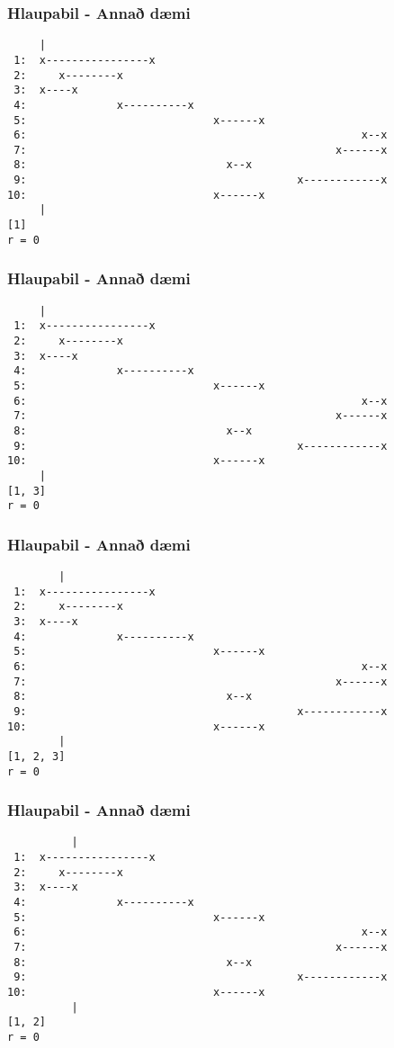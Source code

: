 \documentclass{beamer}
\begin{document}
\begin{frame}[fragile]
	\frametitle{Hlaupabil - Annað dæmi}
\begin{verbatim}
     |
 1:  x----------------x
 2:     x--------x
 3:  x----x
 4:              x----------x
 5:                             x------x
 6:                                                    x--x
 7:                                                x------x
 8:                               x--x
 9:                                          x------------x
10:                             x------x
     |
[1]
r = 0
\end{verbatim}
\end{frame}
\addtocounter{framenumber}{-1}

\begin{frame}[fragile]
	\frametitle{Hlaupabil - Annað dæmi}
\begin{verbatim}
     |
 1:  x----------------x
 2:     x--------x
 3:  x----x
 4:              x----------x
 5:                             x------x
 6:                                                    x--x
 7:                                                x------x
 8:                               x--x
 9:                                          x------------x
10:                             x------x
     |
[1, 3]
r = 0
\end{verbatim}
\end{frame}
\addtocounter{framenumber}{-1}

\begin{frame}[fragile]
	\frametitle{Hlaupabil - Annað dæmi}
\begin{verbatim}
        |
 1:  x----------------x
 2:     x--------x
 3:  x----x
 4:              x----------x
 5:                             x------x
 6:                                                    x--x
 7:                                                x------x
 8:                               x--x
 9:                                          x------------x
10:                             x------x
        |
[1, 2, 3]
r = 0
\end{verbatim}
\end{frame}
\addtocounter{framenumber}{-1}

\begin{frame}[fragile]
	\frametitle{Hlaupabil - Annað dæmi}
\begin{verbatim}
          |
 1:  x----------------x
 2:     x--------x
 3:  x----x
 4:              x----------x
 5:                             x------x
 6:                                                    x--x
 7:                                                x------x
 8:                               x--x
 9:                                          x------------x
10:                             x------x
          |
[1, 2]
r = 0
\end{verbatim}
\end{frame}
\addtocounter{framenumber}{-1}
\end{document}
